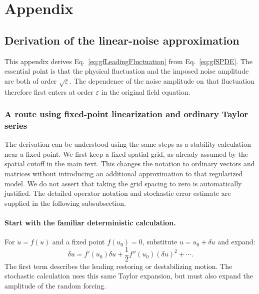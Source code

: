 \documentclass{article}
\begin{document}
\section{Appendix}

\subsection{Derivation of the linear-noise approximation}
\label{appendix:linearNoiseExpansion}

This appendix derives Eq.~\eqref{eq:gfLeadingFluctuation} from Eq.~\eqref{eq:gfSPDE}. The essential point is that the physical fluctuation and the imposed noise amplitude are both of order $\sqrt{\varepsilon}$. The dependence of the noise amplitude on that fluctuation therefore first enters at order $\varepsilon$ in the original field equation.

\subsubsection{A route using fixed-point linearization and ordinary Taylor series}

The derivation can be understood using the same steps as a stability calculation near a fixed point. We first keep a fixed spatial grid, as already assumed by the spatial cutoff in the main text. This changes the notation to ordinary vectors and matrices without introducing an additional approximation to that regularized model. We do not assert that taking the grid spacing to zero is automatically justified. The detailed operator notation and stochastic error estimate are supplied in the following subsubsection.

\paragraph{Start with the familiar deterministic calculation.}
For $\dot u=f(u)$ and a fixed point $f(u_0)=0$, substitute $u=u_0+\delta u$ and expand:
\begin{equation}
    \dot{\delta u}=f'(u_0)\delta u+\frac12f''(u_0)(\delta u)^2+\cdots.
\end{equation}
The first term describes the leading restoring or destabilizing motion. The stochastic calculation uses this same Taylor expansion, but must also expand the amplitude of the random forcing.
\end{document}
